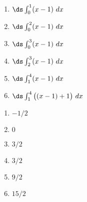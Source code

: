 {\noindent
\begin{minipage}{\linewidth}
\end{minipage}
\begin{enumerate}
\item		$\ds \int_0^1 (x-1)\ dx$
\item		$\ds \int_0^2 (x-1)\ dx$
\item		$\ds \int_0^3 (x-1)\ dx$
\item		$\ds \int_2^3 (x-1)\ dx$
\item		$\ds \int_1^4 (x-1)\ dx$
\item		$\ds \int_1^4 \big((x-1)+1\big)\ dx$
\end{enumerate}

}
{\begin{enumerate}
\item		$-1/2$
\item		$0$
\item		$3/2$
\item		$3/2$
\item		$9/2$
\item		$15/2$
\end{enumerate}
}

